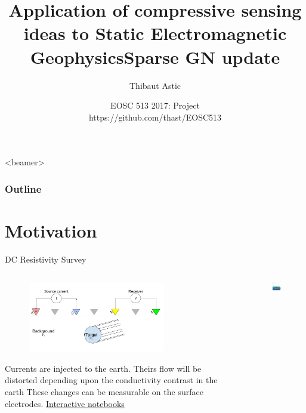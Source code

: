 \documentclass[12pt]{beamer}
\author[]{%
  Thibaut Astic
  }
\title[]{Application of compressive sensing ideas to Static Electromagnetic Geophysics}
\date[]{EOSC 513 2017: Project \\ https://github.com/thast/EOSC513}
\begin{document}
\begin{frame}
  \titlepage
\end{frame}



\title{Sparse GN update}
  \begin{frame}<beamer>
    \frametitle{Outline}
    \tableofcontents
  \end{frame}



\section{Motivation}
\begin{frame}{DC Resistivity Survey}

\begin{columns}
\begin{column}{0.5\textwidth}

\begin{figure}[t!]
    \includegraphics[width=60mm, left]{figures/DCR_Setup_Cylinder.png}
\end{figure}

Currents are injected to the earth. Theirs flow will be distorted depending upon the conductivity contrast in the earth
These changes can be measurable on the surface electrodes. 
\href{https://notebooks.azure.com/library/em_apps}{\color{blue} Interactive notebooks}

\end{column}
\begin{column}{0.5\textwidth}
\begin{figure}[t!]
    \includegraphics[width=60mm, left]{figures/DC_survey.png}
\end{figure}
\end{column}


\end{columns}
\end{frame}
\end{document}
